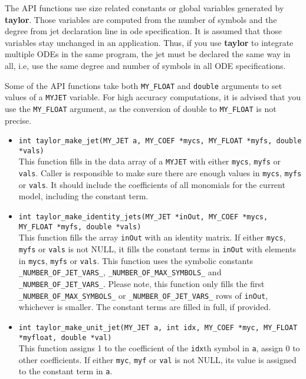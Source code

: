 \documentclass[10pt]{article}
\theoremstyle{remark}
\newcommand{\taylorname}{{\bf taylor}}
\newcommand{\myjet}{{\tt MY\symbol{95}JET}}
\begin{document}
\bigskip
The API functions use size related constants or global variables
generated by \taylorname{}. Those variables are computed from the
number of symbols and the degree from jet declaration line in ode
specification.  It is assumed that those variables stay unchanged in
an application. Thus, if you use \taylorname{} to integrate multiple
ODEs in the same program, the jet must be declared the same way in
all, i.e, use the same degree and number of symbols in all ODE
specifications.

\bigskip
Some of the API functions take both \verb+MY_FLOAT+ and \verb+double+
arguments to set values of a \myjet{} variable.  For high accuracy
computations, it is advised that you use the \verb+MY_FLOAT+ argument,
as the conversion of double to \verb+MY_FLOAT+ is not precise.

\begin{itemize}
\item
  {\verb+int taylor_make_jet(MY_JET a, MY_COEF *mycs, MY_FLOAT *myfs, double *vals)+
    \\ This function fills in the data array of a \myjet{} with either
    \verb+mycs+, \verb+myfs+ or \verb+vals+. Caller is responsible to
    make sure there are enough values in \verb+mycs+, \verb+myfs+ or
    \verb+vals+. It should include the coefficients of all monomials
    for the current model, including the constant term.}
    
\item
  {\verb+int taylor_make_identity_jets(MY_JET *inOut, MY_COEF *mycs, MY_FLOAT *myfs, double *vals)+
    \\ This function fills the array \verb+inOut+ with an identity
    matrix. If either \verb+mycs+, \verb+myfs+ or \verb+vals+ is not
    NULL, it fills the constant terms in \verb+inOut+ with elements in
    \verb+mycs+, \verb+myfs+ or \verb+vals+.  This function uses the
    symbolic constants \verb+_NUMBER_OF_JET_VARS_+,
    \verb+_NUMBER_OF_MAX_SYMBOLS_+ and \verb+_NUMBER_OF_JET_VARS_+.
    Please note, this function only fills the first
    \verb+_NUMBER_OF_MAX_SYMBOLS_+ or \verb+_NUMBER_OF_JET_VARS_+ rows
    of \verb+inOut+, whichever is smaller. The constant terms are
    filled in full, if provided.}
    
\item
  {\verb+int taylor_make_unit_jet(MY_JET a, int idx, MY_COEF *myc, MY_FLOAT *myfloat, double *val)+\\ This
    function assigns 1 to the coefficient of the \verb+idx+th symbol
    in \verb+a+, assign 0 to other coefficients. If either \verb+myc+,
    \verb+myf+ or \verb+val+ is not NULL, its value is assigned to the
    constant term in \verb+a+.  }
    

\end{itemize}
\end{document}
